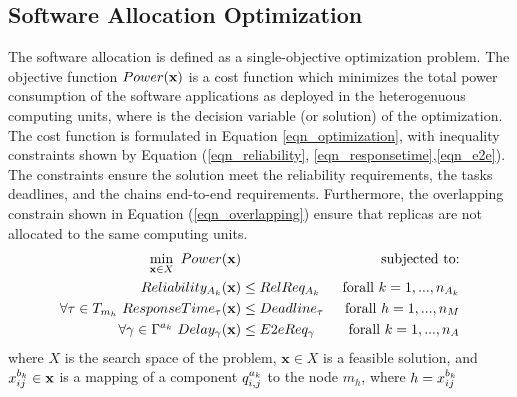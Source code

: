 \subsection{Software Allocation Optimization	}\label{sec_allocation}
The software allocation is defined as a single-objective optimization problem. The objective function  $Power(\textbf{x})$ is a cost function which minimizes the total power consumption of the software applications as deployed in the heterogenuous computing units, where \ttx is the decision variable (or solution) of the optimization. The cost function is formulated in Equation \ref{eqn_optimization}, with inequality constraints shown by Equation (\ref{eqn_reliability}, \ref{eqn_responsetime},\ref{eqn_e2e}). The constraints ensure the solution meet the reliability requirements, the tasks deadlines,  and the chains end-to-end requirements.  Furthermore, the overlapping constrain shown in Equation (\ref{eqn_overlapping}) ensure that replicas are not allocated to the same computing units.
\begin{align}
\label{eqn_optimization}
\min_{\textbf{x}\in X}\ Power(\textbf{x}) & &\text{ subjected to:} \\
\label{eqn_reliability}
\rel_{A_k}(\x)&\leq RelReq_{A_k} & \mbox{ forall } k=1,...,n_{A_k}\\
\label{eqn_responsetime}
\forall \tau\in T_{m_h}\    ResponseTime_{\tau}(\x)&\leq Deadline_{\tau}& \mbox{forall } h=1,...,n_{M}\\ 
\label{eqn_e2e}
\forall \gamma \in \ssp{\Gamma}\  Delay_\gamma(\x)&\leq E2eReq_\gamma& \mbox{forall } k=1,...,n_{A}\\
\end{align}
where $X$ is the search space of the problem, $\textbf{x}\in X$ is a feasible solution, and $x^{b_k}_{ij}\in \textbf{x}$ is a mapping of a component $\sss{q}[k][i,j]$ to the node $m_h$, where $h=x^{b_k}_{ij}$
%
%
